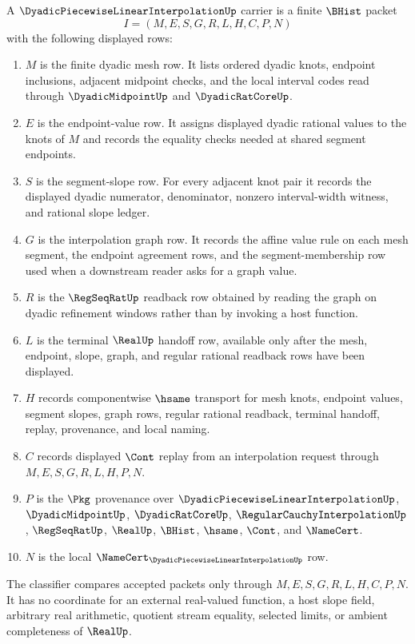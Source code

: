 \begin{definition}
\label{def:dyadic-piecewise-linear-interpolation-carrier}
A $\DyadicPiecewiseLinearInterpolationUp$ carrier is a finite $\BHist$ packet
$$
I=(M,E,S,G,R,L,H,C,P,N)
$$
with the following displayed rows:
\begin{enumerate}
\item $M$ is the finite dyadic mesh row. It lists ordered dyadic knots, endpoint inclusions, adjacent midpoint checks, and the local interval codes read through $\DyadicMidpointUp$ and $\DyadicRatCoreUp$.
\item $E$ is the endpoint-value row. It assigns displayed dyadic rational values to the knots of $M$ and records the equality checks needed at shared segment endpoints.
\item $S$ is the segment-slope row. For every adjacent knot pair it records the displayed dyadic numerator, denominator, nonzero interval-width witness, and rational slope ledger.
\item $G$ is the interpolation graph row. It records the affine value rule on each mesh segment, the endpoint agreement rows, and the segment-membership row used when a downstream reader asks for a graph value.
\item $R$ is the $\RegSeqRatUp$ readback row obtained by reading the graph on dyadic refinement windows rather than by invoking a host function.
\item $L$ is the terminal $\RealUp$ handoff row, available only after the mesh, endpoint, slope, graph, and regular rational readback rows have been displayed.
\item $H$ records componentwise $\hsame$ transport for mesh knots, endpoint values, segment slopes, graph rows, regular rational readback, terminal handoff, replay, provenance, and local naming.
\item $C$ records displayed $\Cont$ replay from an interpolation request through $M,E,S,G,R,L,H,P,N$.
\item $P$ is the $\Pkg$ provenance over $\DyadicPiecewiseLinearInterpolationUp$, $\DyadicMidpointUp$, $\DyadicRatCoreUp$, $\RegularCauchyInterpolationUp$, $\RegSeqRatUp$, $\RealUp$, $\BHist$, $\hsame$, $\Cont$, and $\NameCert$.
\item $N$ is the local $\NameCert_{\DyadicPiecewiseLinearInterpolationUp}$ row.
\end{enumerate}
The classifier compares accepted packets only through $M,E,S,G,R,L,H,C,P,N$. It has no coordinate for an external real-valued function, a host slope field, arbitrary real arithmetic, quotient stream equality, selected limits, or ambient completeness of $\RealUp$.
\end{definition}

